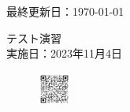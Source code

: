 \documentclass[a4paper,11pt]{jsarticle}
\begin{document}
\begin{titlepage}
  \hfill {最終更新日：\today}
  \begin{center}
    {\Huge\gt テスト演習}\\ \vspace{\baselineskip}
    \textup{\large 実施日：2023年11月4日}\\ 
  \end{center}
  \vfill
  \begin{figure}[H]
    \includegraphics[width=0.1\textwidth]{../graphs/qrcode.png}
  \end{figure}
\end{titlepage}

\qPart

\calcPage

\qPart

\calcPage

\brankPage

\brankPage

\brankPage
\end{document}
